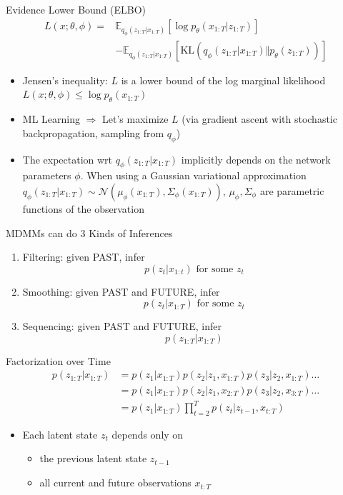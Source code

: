 \documentclass{beamer}
\begin{document}
\begin{frame}{Evidence Lower Bound (ELBO)}
\[\begin{split}
L(x;\theta,\phi)=&\mathbb{E}_{q_\phi(z_{1:T}|x_{1:T})}[\log p_\theta(x_{1:T}|z_{1:T})]\\
&-\mathbb{E}_{q_\phi(z_{1:T}|x_{1:T})}[\text{KL}(q_\phi(z_{1:T}|x_{1:T})\Vert p_\theta(z_{1:T}))]
\end{split}\]
\begin{itemize}
\item Jensen's inequality: $L$ is a lower bound of the log marginal likelihood $L(x;\theta,\phi)\leqslant\log p_\theta(x_{1:T})$
\item ML Learning $\Rightarrow$ Let's maximize $L$ (via gradient ascent with stochastic backpropagation, sampling from $q_\phi$)
\item The expectation wrt $q_\phi(z_{1:T}|x_{1:T})$ implicitly depends on the network parameters $\phi$. When using a Gaussian variational approximation $q_\phi(z_{1:T}|x_{1:T})\sim\mathcal{N}(\mu_\phi(x_{1:T}),\Sigma_\phi(x_{1:T}))$, $\mu_\phi,\Sigma_\phi$ are parametric functions of the observation
\end{itemize}
\end{frame}

\begin{frame}{MDMMs can do 3 Kinds of Inferences}
\begin{enumerate}
\item Filtering: given PAST, infer\[
p(z_t|x_{1:t})\text{ for some }z_t
\]
\item Smoothing: given PAST and FUTURE, infer\[
p(z_t|x_{1:T})\text{ for some }z_t
\]
\item Sequencing: given PAST and FUTURE, infer\[
p(z_{1:T}|x_{1:T})
\]
\end{enumerate}
\end{frame}

\begin{frame}{Factorization over Time}
\[
\begin{split}
p(z_{1:T}|x_{1:T})&=p(z_1|x_{1:T})p(z_2|z_1,x_{1:T})p(z_3|z_2,x_{1:T})\dots\\
&=p(z_1|x_{1:T})p(z_2|z_1,x_{2:T})p(z_3|z_2,x_{3:T})\dots\\
&=p(z_1|x_{1:T})\prod_{t=2}^Tp(z_t|z_{t-1},x_{t:T})
\end{split}
\]
\begin{itemize}
\item Each latent state $z_t$ depends only on
\begin{itemize}
\item the previous latent state $z_{t-1}$
\item all current and future observations $x_{t:T}$
\end{itemize}
\end{itemize}
\end{frame}
\end{document}
